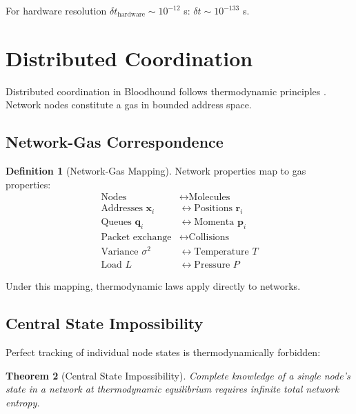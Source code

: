 \documentclass[10pt,twocolumn]{article}
\newtheorem{theorem}{Theorem}[section]
\theoremstyle{definition}
\newtheorem{definition}[theorem]{Definition}
\theoremstyle{remark}
\begin{document}
For hardware resolution $\delta t_{\text{hardware}} \sim 10^{-12}$ s: $\delta t \sim 10^{-133}$ s.

\section{Distributed Coordination}
\label{sec:distributed}

Distributed coordination in Bloodhound follows thermodynamic principles \cite{lamport1978,lynch1996}. Network nodes constitute a gas in bounded address space.

\subsection{Network-Gas Correspondence}

\begin{definition}[Network-Gas Mapping]
Network properties map to gas properties:
\begin{align}
\text{Nodes} &\leftrightarrow \text{Molecules} \\
\text{Addresses } \mathbf{x}_i &\leftrightarrow \text{Positions } \mathbf{r}_i \\
\text{Queues } \mathbf{q}_i &\leftrightarrow \text{Momenta } \mathbf{p}_i \\
\text{Packet exchange} &\leftrightarrow \text{Collisions} \\
\text{Variance } \sigma^2 &\leftrightarrow \text{Temperature } T \\
\text{Load } L &\leftrightarrow \text{Pressure } P
\end{align}
\end{definition}

Under this mapping, thermodynamic laws \cite{landau1980,huang1987} apply directly to networks.

\subsection{Central State Impossibility}

Perfect tracking of individual node states is thermodynamically forbidden:

\begin{theorem}[Central State Impossibility]
Complete knowledge of a single node's state in a network at thermodynamic equilibrium requires infinite total network entropy.
\end{theorem}
\end{document}
